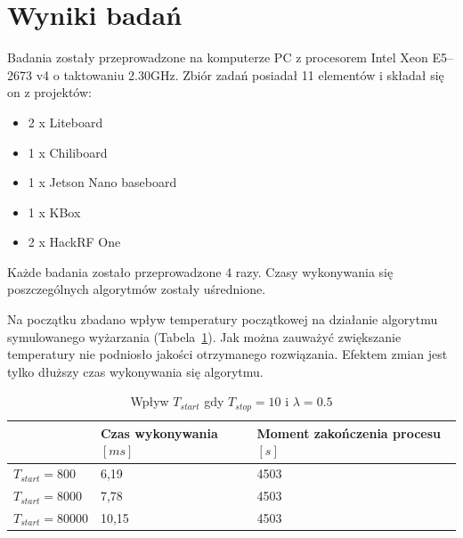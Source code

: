 \section{Wyniki badań}
Badania zostały przeprowadzone na komputerze PC z procesorem Intel Xeon E5--2673 v4 o taktowaniu 2.30GHz. Zbiór zadań posiadał 11 elementów i składał się on z projektów:
\begin{itemize}
	\item 2 x Liteboard
	\item 1 x Chiliboard
	\item 1 x Jetson Nano baseboard
	\item 1 x KBox
	\item 2 x HackRF One
\end{itemize}

Każde badania zostało przeprowadzone 4 razy. Czasy wykonywania się poszczególnych algorytmów zostały uśrednione.

Na początku zbadano wpływ temperatury początkowej na działanie algorytmu symulowanego wyżarzania (Tabela~\ref{tstart_sa}). Jak można zauważyć zwiększanie temperatury nie podniosło jakości otrzymanego rozwiązania. Efektem zmian jest tylko dłuższy czas wykonywania się algorytmu.

\begin{table}[H]
	\centering
	\label{tstart_sa}
	\caption{Wpływ $T_{start}$ gdy $T_{stop}=10$ i $\lambda=0.5$}
	\begin{tabular}{lll}
		\toprule
		                  & Czas wykonywania$[ms]$ & Moment zakończenia procesu$[s]$ \\
		\midrule
		$T_{start}=800$   & 6,19                   & 4503                             \\
		$T_{start}=8000$  & 7,78                   & 4503                             \\
		$T_{start}=80000$ & 10,15                  & 4503                             \\
		\bottomrule
	\end{tabular}
\end{table}

